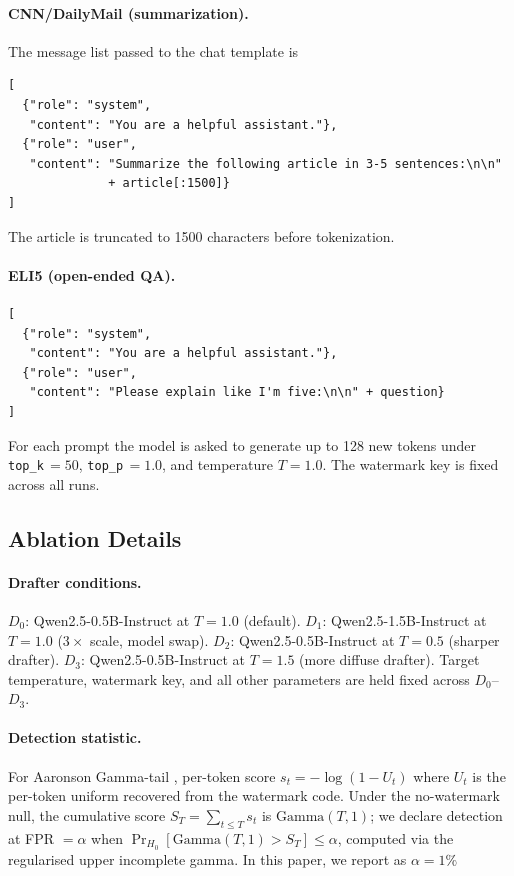 \documentclass{article}
\theoremstyle{plain}
\theoremstyle{definition}
\begin{document}
\paragraph{CNN/DailyMail (summarization).}
The message list passed to the chat template is
\begin{verbatim}
[
  {"role": "system",
   "content": "You are a helpful assistant."},
  {"role": "user",
   "content": "Summarize the following article in 3-5 sentences:\n\n"
              + article[:1500]}
]
\end{verbatim}
The article is truncated to 1500 characters before tokenization.

\paragraph{ELI5 (open-ended QA).}
\begin{verbatim}
[
  {"role": "system",
   "content": "You are a helpful assistant."},
  {"role": "user",
   "content": "Please explain like I'm five:\n\n" + question}
]
\end{verbatim}

For each prompt the model is asked to generate up to 128 new tokens
under \texttt{top\_k}\,$=50$, \texttt{top\_p}\,$=1.0$, and temperature
$T=1.0$.  The watermark key is fixed across all runs.



\subsection{Ablation Details}
\label{app:ablation}
\paragraph{Drafter conditions.}
$D_0$: Qwen2.5-0.5B-Instruct at $T=1.0$ (default).
$D_1$: Qwen2.5-1.5B-Instruct at $T=1.0$ ($3\!\times$ scale, model swap).
$D_2$: Qwen2.5-0.5B-Instruct at $T=0.5$ (sharper drafter).
$D_3$: Qwen2.5-0.5B-Instruct at $T=1.5$ (more diffuse drafter).
Target temperature, watermark key, and all other parameters are held
fixed across $D_0$--$D_3$.
\paragraph{Detection statistic.}
For Aaronson Gamma-tail , per-token score
$s_t = -\log(1 - U_t)$ where $U_t$ is the per-token uniform recovered
from the watermark code. Under the no-watermark null, the cumulative
score $S_T = \sum_{t \le T} s_t$ is $\mathrm{Gamma}(T, 1)$; we declare
detection at FPR $=\alpha$ when $\Pr_{H_0}[\mathrm{Gamma}(T,1)\!>\!S_T]
\le \alpha$, computed via the regularised upper incomplete gamma. In this paper, we report as $\alpha =1\%$
\end{document}

